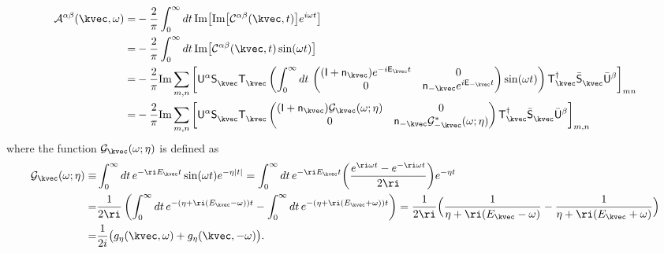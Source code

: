 \begin{equation}
    \begin{split}
        \mathcal{A}^{\alpha\beta}(\kvec, \omega) 
        = & - \frac{2}{\pi} \int_{0}^{\infty} dt \, \mathrm{Im} \big[ \mathrm{Im} \big[ \mathcal{C}^{\alpha\beta}(\kvec, t) \big] e^{i \omega t} \big] \\
        = & - \frac{2}{\pi} \int_{0}^{\infty} dt \, \mathrm{Im} \big[ \mathcal{C}^{\alpha\beta}(\kvec, t) \sin (\omega t) \big] \\
        = & - \frac{2}{\pi} \mathrm{Im} 
        \sum_{m,n}
        \left[ 
        \mathsf{U}^{\alpha} \mathsf{S}_{\kvec}^{\phantom \dagger} \mathsf{T}_{\kvec}^{\phantom \dagger}
        \left( \int_{0}^{\infty} dt \, 
        \begin{pmatrix}
            (\mathsf{I} + \mathsf{n}_{\kvec}) e^{- i \mathsf{E}_{\kvec} t} & 0 \\
            0 & \mathsf{n}_{-\kvec} e^{i \mathsf{E}_{-\kvec} t}
        \end{pmatrix}
        \sin (\omega t)
        \right)
        \mathsf{T}^{\dagger}_{\kvec} \bar{\mathsf{S}}_{\kvec}^{\phantom \dagger} \bar{\mathsf{U}}^{\beta}
        \right]_{mn} \\
        = & -  \frac{2}{\pi} \mathrm{Im} 
        \sum_{m,n}
        \left[ 
            \mathsf{U}^{\alpha} \mathsf{S}_{\kvec}^{\phantom \dagger} \mathsf{T}_{\kvec}^{\phantom \dagger}
            \begin{pmatrix}
                (\mathsf{I + n}_{  \kvec}) \mathcal{G}_{\kvec} (\omega ; \eta) & 0 \\
                0 &  \mathsf{n}_{- \kvec} \mathcal{G}_{-\kvec}^{*} (\omega ; \eta)
            \end{pmatrix}
            \mathsf{T}^{\dagger}_{\kvec} \bar{\mathsf{S}}_{\kvec}^{\phantom \dagger}
            \bar{\mathsf{U}}^{\beta}
        \right]_{m,n}
    \end{split}
\end{equation}
where the function $\mathcal{G}_{\kvec}(\omega ; \eta)$ is defined as 
\begin{align*}
     \mathcal{G}_{\kvec}(\omega ; \eta)
     \equiv & \int_{0}^{\infty} dt \,  e^{- \ri E_{\kvec} t} \sin (\omega t) e^{-\eta |t|} 
     = \int_{0}^{\infty} dt \,  e^{-\ri E_{\kvec} t} \bigg( \frac{e^{\ri \omega t} - e^{- \ri \omega t}}{2\ri} \bigg) e^{-\eta t} \\
     = & \frac{1}{2 \ri} 
     \left( 
     \int_{0}^{\infty} dt \,
     e^{-(\eta + \ri(E_{\kvec} - \omega))t} - \int_{0}^{\infty} dt \, e^{-(\eta + \ri(E_{\kvec} + \omega))t} 
     \right) 
     = \frac{1}{2 \ri} \Big( \frac{1}{\eta + \ri(E_{\kvec} - \omega)} - \frac{1}{\eta + \ri(E_{\kvec} + \omega)} \Big) \\
     = & \frac{1}{2i} \big( g_{\eta}(\kvec, \omega) + g_{\eta} (\kvec, - \omega) \big).
\end{align*}

